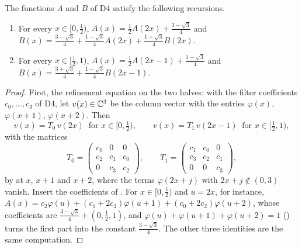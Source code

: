 \begin{lemma}
\label{lem:daub-d4-recursions}
\leanok
{}
The functions $A$ and $B$ of D4 satisfy the following recursions.
\begin{enumerate}
  \item For every $x \in [0, \frac12)$, $A(x) = \frac12 A(2x) + \frac{3 - \sqrt 3}{4}$ and
    $B(x) = \frac{3 - \sqrt 3}{4} + \frac{1 - \sqrt 3}{4} A(2x) + \frac{1 + \sqrt 3}{4} B(2x)$.
  \item For every $x \in [\frac12, 1)$, $A(x) = \frac12 A(2x - 1) + \frac{1 - \sqrt 3}{4}$ and
    $B(x) = \frac{3 + \sqrt 3}{4} + \frac{1 - \sqrt 3}{4} B(2x - 1)$.
\end{enumerate}
\end{lemma}

\begin{proof}
\leanok
{}
First, the refinement equation on the two halves: with the filter coefficients
$c_0, \dots, c_3$ of D4, let $v(x) \in \mathbb{C}^3$ be the column vector with the entries $\varphi(x)$,
$\varphi(x + 1)$, $\varphi(x + 2)$. Then
\[
  v(x) = T_0 \, v(2x) \ \text{ for } x \in [0, \tfrac12) , \qquad
  v(x) = T_1 \, v(2x - 1) \ \text{ for } x \in [\tfrac12, 1) ,
\]
with the matrices
\[
  T_0 = \begin{pmatrix} c_0 & 0 & 0 \\ c_2 & c_1 & c_0 \\ 0 & c_3 & c_2 \end{pmatrix} , \qquad
  T_1 = \begin{pmatrix} c_1 & c_0 & 0 \\ c_3 & c_2 & c_1 \\ 0 & 0 & c_3 \end{pmatrix} ,
\]
by  at $x$, $x + 1$ and $x + 2$, where the terms $\varphi(2x + j)$
with $2x + j \notin (0, 3)$ vanish. Insert the coefficients of . For
$x \in [0, \frac12)$ and $u = 2x$, for instance,
$A(x) = c_2 \varphi(u) + (c_1 + 2c_3) \varphi(u + 1) + (c_0 + 2c_2) \varphi(u + 2)$, whose
coefficients are $\frac{3 - \sqrt 3}{4} + (0, \frac12, 1)$, and
$\varphi(u) + \varphi(u + 1) + \varphi(u + 2) = 1$ () turns the first
part into the constant $\frac{3 - \sqrt 3}{4}$. The other three identities are the same
computation.
\end{proof}

